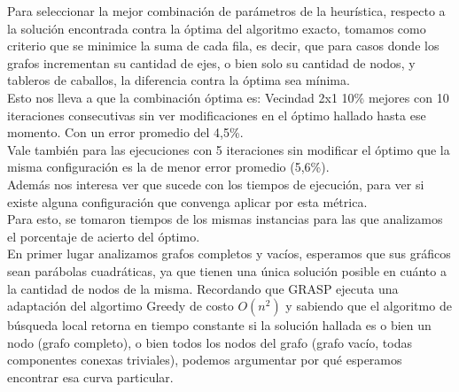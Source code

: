 \newpage

Para seleccionar la mejor combinaci\'on de par\'ametros de la heur\'istica, respecto a la soluci\'on encontrada contra la \'optima del algoritmo exacto, tomamos como criterio que se minimice la suma de cada fila, es decir, que para casos donde los grafos incrementan su cantidad de ejes, o bien solo su cantidad de nodos, y tableros de caballos, la diferencia contra la \'optima sea m\'inima.\\

Esto nos lleva a que la combinaci\'on \'optima es: Vecindad 2x1 10\% mejores con 10 iteraciones consecutivas sin ver modificaciones en el \'optimo hallado hasta ese momento. Con un error promedio del 4,5\%.\\

Vale tambi\'en para las ejecuciones con 5 iteraciones sin modificar el \'optimo que la misma configuraci\'on es la de menor error promedio (5,6\%).\\

Adem\'as nos interesa ver que sucede con los tiempos de ejecuci\'on, para ver si existe alguna configuraci\'on que convenga aplicar por esta m\'etrica.\\

Para esto, se tomaron tiempos de los mismas instancias para las que analizamos el porcentaje de acierto del \'optimo.\\

En primer lugar analizamos grafos completos y vac\'ios, esperamos que sus gr\'aficos sean par\'abolas cuadr\'aticas, ya que tienen una \'unica soluci\'on posible en cu\'anto a la cantidad de nodos de la misma. Recordando que GRASP ejecuta una adaptaci\'on del algortimo Greedy de costo $O(n^2)$ y sabiendo que el algoritmo de b\'usqueda local retorna en tiempo constante si la soluci\'on hallada es o bien un nodo (grafo completo), o bien todos los nodos del grafo (grafo vac\'io, todas componentes conexas triviales), podemos argumentar por qu\'e esperamos encontrar esa curva particular.\\

